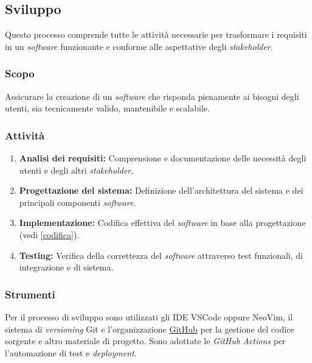 \subsection{Sviluppo}

Questo processo comprende tutte le attività necessarie per trasformare i
requisiti in un \textit{software} funzionante e conforme alle aspettative degli
\textit{stakeholder}.

\subsubsection{Scopo}
Assicurare la creazione di un \textit{software} che risponda pienamente ai
bisogni degli utenti, sia tecnicamente valido, mantenibile e scalabile.

\subsubsection{Attività}
\begin{enumerate}
	\item \textbf{Analisi dei requisiti:} Comprensione e documentazione delle
	      necessità degli utenti e degli altri \textit{stakeholder}.
	\item \textbf{Progettazione del sistema:} Definizione dell'architettura del
	      sistema e dei principali componenti \textit{software}.
	\item \textbf{Implementazione:} Codifica effettiva del \textit{software} in
	      base alla progettazione (vedi \autoref{codifica}).
	\item \textbf{Testing:} Verifica della correttezza del \textit{software}
	      attraverso test funzionali, di integrazione e di sistema.
\end{enumerate}

\subsubsection{Strumenti}
Per il processo di sviluppo sono utilizzati gli IDE VSCode oppure NeoVim, il
sistema di \textit{versioning} Git e l'organizzazione
\href{https://github.com/Project-SWEnergy}{GitHub} per la gestione del codice
sorgente e altro materiale di progetto. Sono adottate le \textit{GitHub Actions}
per l'automazione di test e \textit{deployment}.
